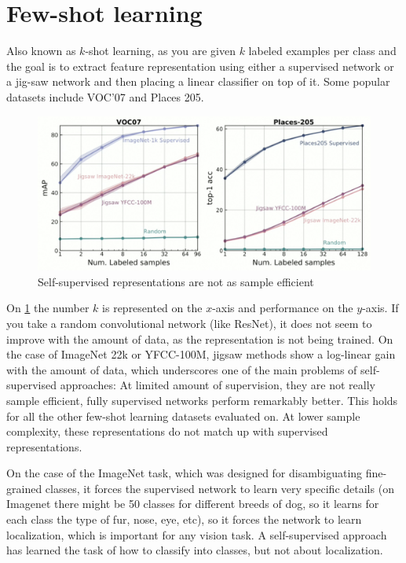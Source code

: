 \section{Few-shot learning}

Also known as $k$-shot learning, as you are given $k$ labeled examples per class and the goal is to extract feature representation using either a supervised network or a jig-saw network and then placing a linear classifier on top of it. Some popular datasets include VOC’07 and Places 205.

\begin{figure}[H]
\centering
\includegraphics[width=0.8\linewidth]{lectures/14-b/graphics/Self_supervised.png}
\caption{Self-supervised representations are not as sample efficient}\label{fig:Self_supervised}
\end{figure}



On \ref{fig:Self_supervised} the number $k$ is represented on the $x$-axis and performance on the $y$-axis. If you take a random convolutional network (like ResNet), it does not seem to improve with the amount of data, as the representation is not being trained. On the case of ImageNet 22k or YFCC-100M, jigsaw methods show a log-linear gain with the amount of data, which underscores one of the main problems of self-supervised approaches: At limited amount of supervision, they are not really sample efficient, fully supervised networks perform remarkably better. This holds for all the other few-shot learning datasets evaluated on. At lower sample complexity, these representations do not match up with supervised representations.

On the case of the ImageNet task, which was designed for disambiguating fine-grained classes, it forces the supervised network to learn very specific details (on Imagenet there might be 50 classes for different breeds of dog, so it learns for each class the type of fur, nose, eye, etc), so it forces the network to learn localization, which is important for any vision task. A self-supervised approach has learned the task of how to classify into classes, but not about localization.

